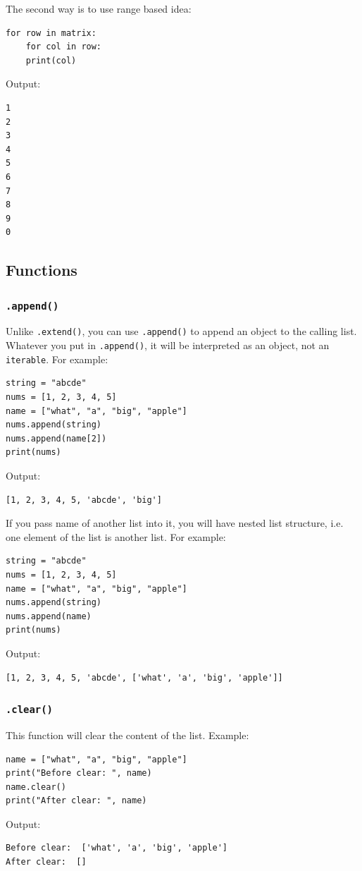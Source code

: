 \documentclass[12pt]{book}
\begin{document}
The second way is to use range based idea:
\begin{verbatim}
for row in matrix:
    for col in row:
	print(col)
\end{verbatim}
Output:
\begin{verbatim}
1
2
3
4
5
6
7
8
9
0
\end{verbatim}

\subsection{Functions}
\label{sec:org4baa5be}
\subsubsection{\texttt{.append()}}
\label{sec:org20d59df}
Unlike \texttt{.extend()}, you can use \texttt{.append()} to append an object to the calling list. Whatever you put in \texttt{.append()}, it will be interpreted as an object, not an \texttt{iterable}. For example:
\begin{verbatim}
string = "abcde"
nums = [1, 2, 3, 4, 5]
name = ["what", "a", "big", "apple"]
nums.append(string)
nums.append(name[2])
print(nums)
\end{verbatim}
Output:
\begin{verbatim}
[1, 2, 3, 4, 5, 'abcde', 'big']
\end{verbatim}

If you pass name of another list into it, you will have nested list structure, i.e. one element of the list is another list. For example:
\begin{verbatim}
string = "abcde"
nums = [1, 2, 3, 4, 5]
name = ["what", "a", "big", "apple"]
nums.append(string)
nums.append(name)
print(nums)
\end{verbatim}
Output:
\begin{verbatim}
[1, 2, 3, 4, 5, 'abcde', ['what', 'a', 'big', 'apple']]
\end{verbatim}
\subsubsection{\texttt{.clear()}}
\label{sec:org9b83ac7}
This function will clear the content of the list. Example:
\begin{verbatim}
name = ["what", "a", "big", "apple"]
print("Before clear: ", name)
name.clear()
print("After clear: ", name)
\end{verbatim}
Output:
\begin{verbatim}
Before clear:  ['what', 'a', 'big', 'apple']
After clear:  []
\end{verbatim}
\end{document}
